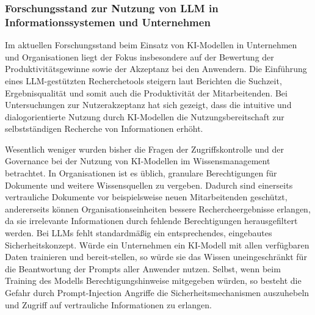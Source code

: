 \subsubsection{Forschungsstand zur Nutzung von LLM in Informationssystemen und Unternehmen}
Im aktuellen Forschungsstand beim Einsatz von KI-Modellen in Unternehmen und Organisationen liegt der Fokus insbesondere auf der Bewertung der Produktivitätsgewinne sowie der Akzeptanz bei den Anwendern. Die Einführung eines LLM-gestützten Recherchetools steigern laut Berichten die Suchzeit, Ergebnisqualität und somit auch die Produktivität der Mitarbeitenden. Bei Untersuchungen zur Nutzerakzeptanz hat sich gezeigt, dass die intuitive und dialogorientierte Nutzung durch KI-Modellen die Nutzungsbereitschaft zur selbstständigen Recherche von Informationen erhöht. 

Wesentlich weniger wurden bisher die Fragen der Zugriffskontrolle und der Governance bei der Nutzung von KI-Modellen im Wissensmanagement betrachtet. In Organisationen ist es üblich, granulare Berechtigungen für Dokumente und weitere Wissensquellen zu vergeben. Dadurch sind einerseits vertrauliche Dokumente vor beispielsweise neuen Mitarbeitenden geschützt, andererseits können Organisationseinheiten bessere Rechercheergebnisse erlangen, da sie irrelevante Informationen durch fehlende Berechtigungen herausgefiltert werden.  Bei LLMs fehlt standardmäßig ein entsprechendes, eingebautes Sicherheitskonzept. Würde ein Unternehmen ein KI-Modell mit allen verfügbaren Daten trainieren und bereit-stellen, so würde sie das Wissen uneingeschränkt für die Beantwortung der Prompts aller Anwender nutzen. Selbst, wenn beim Training des Modells Berechtigungshinweise mitgegeben würden, so besteht die Gefahr durch Prompt-Injection Angriffe die Sicherheitsmechanismen auszuhebeln und Zugriff auf vertrauliche Informationen zu erlangen. 


